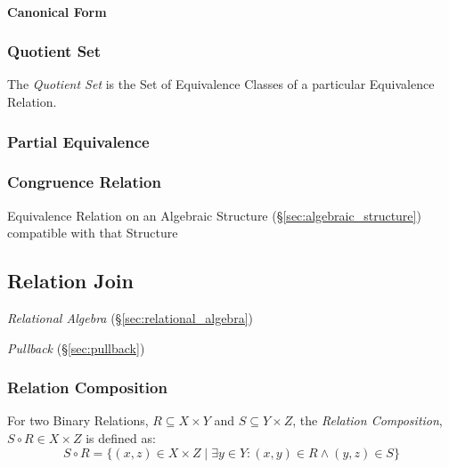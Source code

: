 \paragraph{Canonical Form}\label{sec:canonical_form}\hfill



\subsubsection{Quotient Set}\label{sec:quotient_set}

The \emph{Quotient Set} is the Set of Equivalence Classes of a
particular Equivalence Relation.



\subsubsection{Partial Equivalence}\label{sec:partial_equivalence}

\subsubsection{Congruence Relation}\label{sec:congruence_relation}

Equivalence Relation on an Algebraic Structure
(\S\ref{sec:algebraic_structure}) compatible with that Structure



\subsection{Relation Join}\label{sec:relation_join}

\emph{Relational Algebra} (\S\ref{sec:relational_algebra})

\emph{Pullback} (\S\ref{sec:pullback})



\subsubsection{Relation Composition}\label{sec:relation_composition}

For two Binary Relations, $R \subseteq X \times Y$ and $S \subseteq Y
\times Z$, the \emph{Relation Composition}, $S \circ R \in X \times Z$
is defined as:
\[
  S \circ R = \{(x,z) \in X \times Z \;|\;
  \exists y \in Y : (x,y) \in R \wedge (y,z) \in S \}
\]

